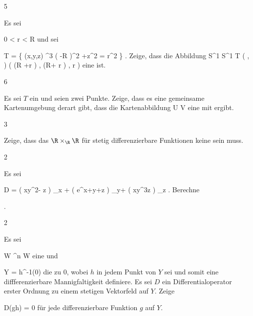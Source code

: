 
{5}
{

Es sei

\mavergleichskette
{\vergleichskette
{ 0
}
{ < }{ r
}
{ < }{ R
}
{    }{
}
{   }{
}
}
{}{}{}
und sei

\mavergleichskettedisp
{\vergleichskette
{ T
}
{ =} { \left\{ (x,y,z) \in \R^3  \mid   \left(   -R  \right)^2 +z^2 = r^2         \right\}
}
{ } {
}
{ } {
}
{ } {
}
}
{}{}{.}
Zeige, dass die Abbildung
\maabbeledisp {} { S^1 \times S^1 } { T
} { ( \varphi, \psi) } {( (R +r \cos  \psi) \cos \varphi, (R+ r \cos  \psi ) \sin \varphi ,  r \sin  \psi )
} {}
eine
ist.

}
{} {}

{6}
{

Es sei $T$ ein
und seien
 zwei Punkte. Zeige, dass es eine gemeinsame Kartenumgebung
 derart gibt, dass die Kartenabbildung
\maabbdisp {\alpha} { U } { V
} {}
eine
mit
\mathl{V= {]0,1[} \times  {]0,1[}}{} ergibt.

}
{} {}

{3}
{

Zeige, dass das
$\R \times_\R \R$ für stetig differenzierbare Funktionen
 {\R} {\R
} {}
keine
sein muss.

}
{} {}

{2}
{

Es sei

\mavergleichskettedisp
{\vergleichskette
{ D
}
{ =} { \left(  xy^2-  \sin z  \right)  \partial_x +  \left(  e^{x+y+z}  \right) \partial_y+  \left(  xy^3z  \right) \partial_z
}
{ } {
}
{ } {
}
{ } {
}
}
{}{}{.}
Berechne

 { . }

}
{} {}

{2}
{

Es sei

\mavergleichskette
{\vergleichskette
{ W
}
{ \subseteq }{ \R^n
}
{  }{
}
{    }{
}
{   }{
}
}
{}{}{}
 { W } { \R
} {}
eine
und

\mavergleichskette
{\vergleichskette
{ Y
}
{ = }{ h^{-1}(0)
}
{  }{
}
{    }{
}
{   }{
}
}
{}{}{}
die
zu $0$, wobei $h$ in jedem Punkt von $Y$
sei und somit eine diffferenzierbare Mannigfaltigkeit definiere. Es sei $D$ ein Differentialoperator erster Ordnung zu einem stetigen Vektorfeld auf $Y$. Zeige

\mavergleichskettedisp
{\vergleichskette
{ D(gh)
}
{ =} { 0
}
{ } {
}
{ } {
}
{ } {
}
}
{}{}{}
für jede differenzierbare Funktion $g$ auf $Y$.

}
{} {}

